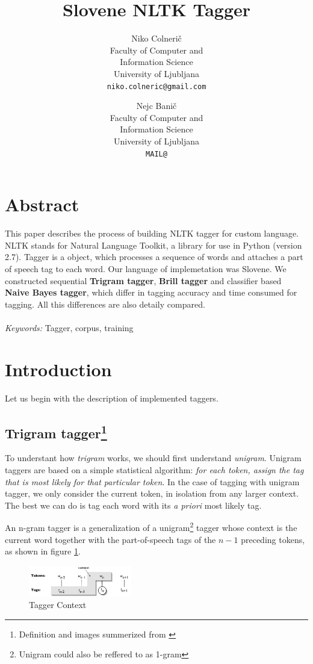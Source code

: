 \documentclass[10pt, conference, compsocconf]{IEEEtran}
\title{Slovene NLTK Tagger}
\author{
	Niko Colnerič \\
	\footnotesize Faculty of Computer and \\
	\footnotesize Information Science \\
	\footnotesize University of Ljubljana \\
	\footnotesize \texttt{niko.colneric@gmail.com} \\
	\and
	Nejc Banič \\
	\footnotesize Faculty of Computer and \\
	\footnotesize Information Science \\
	\footnotesize University of Ljubljana \\
	\footnotesize \texttt{MAIL@} \\
}
\begin{document}
\maketitle
\thispagestyle{empty}

\section*{Abstract} %
This paper describes the process of building NLTK tagger for custom language. NLTK stands for Natural Language Toolkit, a library for use in Python (version 2.7).
Tagger is a object, which processes a sequence of words and attaches a part of speech tag to each word.
Our language of implemetation was Slovene.
We constructed sequential \textbf{Trigram tagger}, \textbf{Brill tagger} and classifier based \textbf{Naive Bayes tagger}, which differ in tagging accuracy and time consumed for tagging. All this differences are also detaily compared.
\\\\
\textit{Keywords:} Tagger, corpus, training

\section{Introduction} %
Let us begin with the description of implemented taggers.

\subsection[Trigram tagger]{Trigram tagger\footnote{Definition and images summerized from \cite{NLTKBOOK}}}
To understant how \textit{trigram} works, we should first understand \textit{unigram}.
Unigram taggers are based on a simple statistical algorithm: \textit{for each token, assign the tag that is most likely for that particular token}.
In the case of tagging with unigram tagger, we only consider the current token, in isolation from any larger context. The best we can do is tag each word with its \textit{a priori} most likely tag.
\par
An n-gram tagger is a generalization of a unigram\footnote{Unigram could also be reffered to as 1-gram} tagger whose context is the current word together with the part-of-speech tags of the $n-1$ preceding tokens, as shown in figure \ref{fig:trigram}.

\begin{figure}[htb]
\begin{center}
\includegraphics[width=0.4\textwidth]{tag-context.png} 
\end{center}
\caption{Tagger Context}
\label{fig:trigram}
\end{figure}
\end{document}
